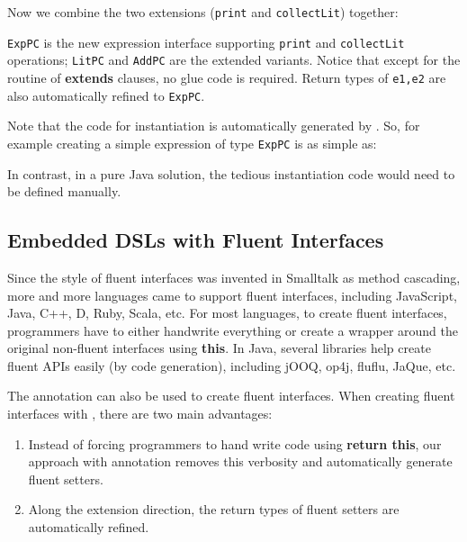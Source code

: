 
\noindent Now we combine the two extensions (\texttt{print} and
\texttt{collectLit}) together:



\noindent \texttt{ExpPC} is the new expression interface supporting
\texttt{print} and \texttt{collectLit} operations; \texttt{LitPC} and
\texttt{AddPC} are the extended variants. Notice that except for the routine of
\textbf{extends} clauses, no glue code is required. Return types of
\texttt{e1,e2} are also automatically refined to \texttt{ExpPC}.

Note that the code for instantiation is automatically generated by \mixin. 
So, for example creating a simple expression of type \texttt{ExpPC} is 
as simple as:


\noindent In contrast, in a pure Java solution, the tedious instantiation code would need 
to be defined manually. 


\subsection{Embedded DSLs with Fluent Interfaces}
Since the style of fluent interfaces was invented in Smalltalk as method
cascading, more and more languages came to support fluent interfaces, including
JavaScript, Java, C++, D, Ruby, Scala, etc. For most languages, to create fluent
interfaces, programmers have to either handwrite everything or create a
wrapper around the original non-fluent interfaces using \textbf{this}. In Java,
several libraries help create fluent APIs easily (by code generation), including
jOOQ, op4j, fluflu, JaQue, etc. 

The \mixin annotation can also be used to create fluent interfaces. 
When creating fluent interfaces with \mixin, there are two main advantages:
\begin{enumerate}
\item Instead of forcing programmers to hand write code using \textbf{return
    this}, our approach with \mixin annotation removes this verbosity and
  automatically generate fluent setters.
\item Along the extension direction, the return types of fluent setters are
  automatically refined.
\end{enumerate} 

